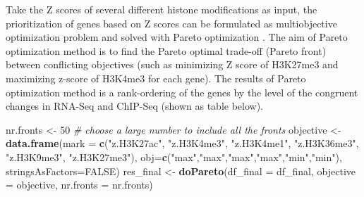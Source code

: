 \documentclass[10pt,]{article}
\newenvironment{Shaded}{\begin{snugshade}}{\end{snugshade}}
\newcommand{\CommentTok}[1]{\textcolor[rgb]{0.56,0.35,0.01}{\textit{#1}}}
\newcommand{\DataTypeTok}[1]{\textcolor[rgb]{0.13,0.29,0.53}{#1}}
\newcommand{\DecValTok}[1]{\textcolor[rgb]{0.00,0.00,0.81}{#1}}
\newcommand{\KeywordTok}[1]{\textcolor[rgb]{0.13,0.29,0.53}{\textbf{#1}}}
\newcommand{\NormalTok}[1]{#1}
\newcommand{\OtherTok}[1]{\textcolor[rgb]{0.56,0.35,0.01}{#1}}
\newcommand{\StringTok}[1]{\textcolor[rgb]{0.31,0.60,0.02}{#1}}
\begin{document}
Take the Z scores of several different histone modifications as input,
the prioritization of genes based on Z scores can be formulated as
multiobjective optimization problem and solved with Pareto optimization
\autocite{ngatchou2005}. The aim of Pareto optimization method is to
find the Pareto optimal trade-off (Pareto front) between conflicting
objectives (such as minimizing Z score of H3K27me3 and maximizing
z-score of H3K4me3 for each gene). The results of Pareto optimization
method is a rank-ordering of the genes by the level of the congruent
changes in RNA-Seq and ChIP-Seq (shown as table below).

\begin{Shaded}
\begin{Highlighting}[]
\NormalTok{nr.fronts <-}\StringTok{ }\DecValTok{50} \CommentTok{# choose a large number to include all the fronts}
\NormalTok{objective <-}\StringTok{ }\KeywordTok{data.frame}\NormalTok{(}\DataTypeTok{mark =} \KeywordTok{c}\NormalTok{(}\StringTok{"z.H3K27ac"}\NormalTok{, }\StringTok{"z.H3K4me3"}\NormalTok{, }\StringTok{"z.H3K4me1"}\NormalTok{,}
                                 \StringTok{"z.H3K36me3"}\NormalTok{, }\StringTok{"z.H3K9me3"}\NormalTok{, }\StringTok{"z.H3K27me3"}\NormalTok{), }
                        \DataTypeTok{obj=}\KeywordTok{c}\NormalTok{(}\StringTok{"max"}\NormalTok{,}\StringTok{"max"}\NormalTok{,}\StringTok{"max"}\NormalTok{,}\StringTok{"max"}\NormalTok{,}\StringTok{"min"}\NormalTok{,}\StringTok{"min"}\NormalTok{),}
                        \DataTypeTok{stringsAsFactors=}\OtherTok{FALSE}\NormalTok{)}
\NormalTok{res_final <-}\StringTok{ }\KeywordTok{doPareto}\NormalTok{(}\DataTypeTok{df_final =}\NormalTok{ df_final, }
                      \DataTypeTok{objective =}\NormalTok{ objective, }
                      \DataTypeTok{nr.fronts =}\NormalTok{ nr.fronts)}
\end{Highlighting}
\end{Shaded}
\end{document}
